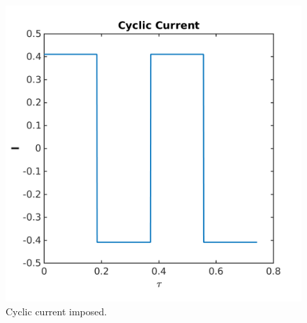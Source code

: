 \documentclass[]{article}
\begin{document}
\begin{figure}[h]
    \centering
    \includegraphics[trim = 0in 0in 0in 0in, clip, width=1.1\textwidth]{figures/I_cycl.png}      
    \caption{Cyclic current imposed.}
    \label{fig:I_cycl}
\end{figure}
\end{document}
